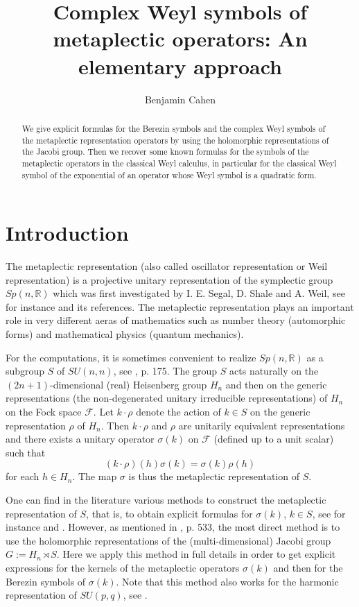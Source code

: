 \documentclass[12pt]{amsart}
\title [Complex Weyl symbols...]{ Complex Weyl symbols of metaplectic operators: An elementary approach}
\author {Benjamin Cahen}
\numberwithin{equation}{section}
\begin{document}
\maketitle

\begin{abstract} We give explicit formulas for the Berezin symbols and the complex Weyl symbols of the metaplectic representation operators by using the holomorphic representations of the Jacobi group. Then we recover some known formulas for the symbols of the metaplectic operators in the classical Weyl calculus, in particular for the classical Weyl symbol of the exponential of an operator whose Weyl symbol is a quadratic form.
\end{abstract}

\vspace{1cm}


\section {Introduction} \label{sec:intro}
The metaplectic representation (also called oscillator representation or Weil representation) is
a projective unitary representation of the symplectic group $Sp(n,{\mathbb R})$ which was first investigated by I. E. Segal,
D. Shale and A. Weil, see for instance \cite{Fo} and its references. The metaplectic representation plays an important role in very different aeras of mathematics such as number theory (automorphic forms) and mathematical physics (quantum mechanics).

For the computations, it is sometimes convenient to realize $Sp(n,{\mathbb R})$ as a subgroup $S$ of $SU(n,n)$, see \cite{Fo}, p. 175.  The group $S$ acts naturally
on the $(2n+1)$-dimensional
(real) Heisenberg group $H_n$ and then on the generic representations (the non-degenerated unitary irreducible representations) of $H_n$ on the Fock space $\mathcal F$.
Let $k\cdot \rho$ denote the action of 
$k\in S$ on the generic representation $ \rho$ of $H_n$.
Then $k\cdot  \rho$
and $ \rho$ are unitarily equivalent representations and there exists a unitary operator $\sigma(k)$ on $\mathcal F$ (defined up to a unit scalar) such that 
\begin{equation}\label{eq:inter}(k\cdot  \rho)(h)\sigma(k)=\sigma(k) \rho(h)\end{equation}
for each $h\in H_n$. The map $\sigma$ is thus the metaplectic representation of $S$.

One can find in the literature various methods to construct the metaplectic representation of $S$, that is, to obtain explicit formulas for $\sigma(k)$, $k\in S$,
see for instance \cite{Fo}  and \cite{KVe}. However, as mentioned in \cite{Ne}, p. 533, the most direct method is to use the holomorphic representations of the (multi-dimensional) Jacobi group $G:=H_n\rtimes S$. Here we apply this method in full details in order to get explicit expressions for the kernels of the metaplectic operators $\sigma(k)$ and then for the Berezin symbols of  $\sigma(k)$. Note that this method also works for the harmonic representation of 
$SU(p,q)$, see \cite{CaHarm}.
\end{document}
